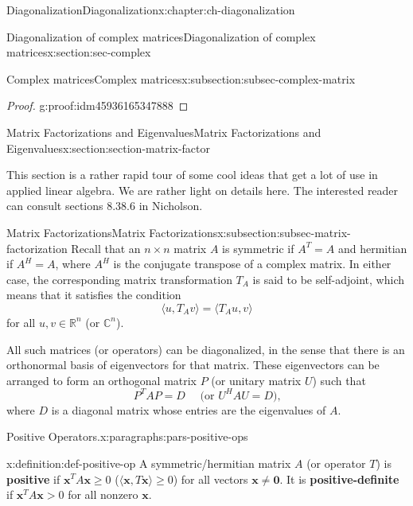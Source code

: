 \documentclass[oneside,10pt,]{book}
\newcommand{\terminology}[1]{\textbf{#1}}
\numberwithin{equation}{section}
\newcommand{\xx}{\mathbf{x}}
\newcommand{\zer}{\mathbf{0}}
\newcommand{\gt}{>}
\begin{document}
\begin{chapterptx}{Diagonalization}{}{Diagonalization}{}{}{x:chapter:ch-diagonalization}
\begin{sectionptx}{Diagonalization of complex matrices}{}{Diagonalization of complex matrices}{}{}{x:section:sec-complex}
\begin{subsectionptx}{Complex matrices}{}{Complex matrices}{}{}{x:subsection:subsec-complex-matrix}
\begin{proof}{}{g:proof:idm45936165347888}
\end{proof}
\end{subsectionptx}
\end{sectionptx}
%
%
\typeout{************************************************}
\typeout{************************************************}
%
\begin{sectionptx}{Matrix Factorizations and Eigenvalues}{}{Matrix Factorizations and Eigenvalues}{}{}{x:section:section-matrix-factor}
\begin{introduction}{}%
This section is a rather rapid tour of some cool ideas that get a lot of use in applied linear algebra. We are rather light on details here. The interested reader can consult sections 8.3\textendash{}8.6 in Nicholson.%
\end{introduction}%
%
%
\typeout{************************************************}
\typeout{************************************************}
%
\begin{subsectionptx}{Matrix Factorizations}{}{Matrix Factorizations}{}{}{x:subsection:subsec-matrix-factorization}
Recall that an \(n\times n\) matrix \(A\) is symmetric if \(A^T=A\) and hermitian if \(A^H=A\), where \(A^H\) is the conjugate transpose of a complex matrix. In either case, the corresponding matrix transformation \(T_A\) is said to be self-adjoint, which means that it satisfies the condition%
\begin{equation*}
\langle u,T_Av\rangle = \langle T_Au,v\rangle
\end{equation*}
for all \(u,v\in \mathbb{R}^n\) (or \(\mathbb{C}^n\)).%
\par
All such matrices (or operators) can be diagonalized, in the sense that there is an orthonormal basis of eigenvectors for that matrix. These eigenvectors can be arranged to form an orthogonal matrix \(P\) (or unitary matrix \(U\)) such that%
\begin{equation*}
P^TAP = D \quad \text{ (or } U^HAU=D)\text{,}
\end{equation*}
where \(D\) is a diagonal matrix whose entries are the eigenvalues of \(A\).%
\begin{paragraphs}{Positive Operators.}{x:paragraphs:pars-positive-ops}%
\begin{definition}{}{x:definition:def-positive-op}%
A symmetric\slash{}hermitian matrix \(A\) (or operator \(T\)) is \terminology{positive} if \(\xx^TA\xx\geq 0\) (\(\langle \xx,T\xx\rangle\geq 0\)) for all vectors \(\xx\neq \zer\). It is \terminology{positive-definite} if \(\xx^TA\xx\gt 0\) for all nonzero \(\xx\).%

\end{definition}
\end{paragraphs}
\end{subsectionptx}
\end{sectionptx}
\end{chapterptx}
\end{document}
